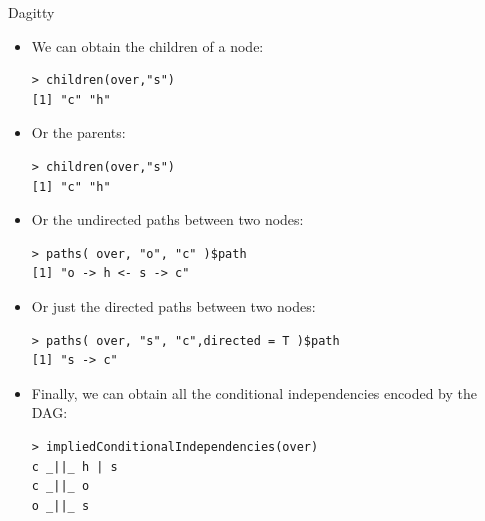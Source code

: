 \documentclass[handout]{beamer}
\begin{document}
\begin{frame}[fragile]{Dagitty}
\scriptsize{
\begin{itemize}



\item We can obtain the children of a node:

\begin{verbatim}
> children(over,"s")
[1] "c" "h"
\end{verbatim}

\item Or the parents:

\begin{verbatim}
> children(over,"s")
[1] "c" "h" 
\end{verbatim}


\item Or the undirected paths between two nodes:

\begin{verbatim}
> paths( over, "o", "c" )$path
[1] "o -> h <- s -> c"
\end{verbatim}

\item Or just the directed paths between two nodes:

\begin{verbatim}
> paths( over, "s", "c",directed = T )$path
[1] "s -> c" 
\end{verbatim}

\item Finally, we can obtain all the conditional independencies encoded by the DAG:

\begin{verbatim}
> impliedConditionalIndependencies(over)
c _||_ h | s
c _||_ o
o _||_ s 
\end{verbatim}


\end{itemize}


} 

\end{frame}
\end{document}
